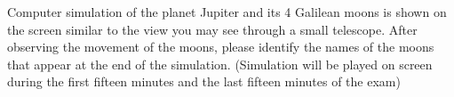Computer simulation of the planet Jupiter and its 4 Galilean moons is shown
on the screen similar to the view you may see through a small telescope.
After observing the movement of the moons, please identify the names of the
moons that appear at the end of the simulation. (Simulation will be played on
screen during the first fifteen minutes and the last fifteen minutes of the
exam)

